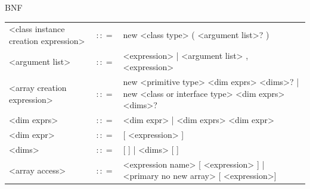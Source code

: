 \documentclass[landscape, 11pt]{article}
\begin{document}
\begin{qsection}{BNF}
\begin{enumerate}[label=\bt{\theenumi.}]
\begin{longtable}{R{7cm} c L{15cm}}
				\\
				<class instance creation expression>		&	$\colon\colon=$	&	new <class type> ( <argument list>? )
				\\
				<argument list>								&	$\colon\colon=$	&	<expression> | <argument list> , <expression>
				\\
				<array creation expression>					&	$\colon\colon=$	&	new <primitive type> <dim exprs> <dims>? | new <class or interface type> <dim exprs> <dims>?
				\\
				<dim exprs>									&	$\colon\colon=$	&	<dim expr> | <dim exprs> <dim expr>
				\\
				<dim expr>									&	$\colon\colon=$	&	[ <expression> ]
				\\
				<dims>										&	$\colon\colon=$	&	[ ] | <dims> [ ]
				\\
				<array access>								&	$\colon\colon=$	&	<expression name> [ <expression> ] | <primary no new array> [ <expression>]
			\end{longtable}

		\ditem[Expressions.]


\end{enumerate}
\end{qsection}
\end{document}
